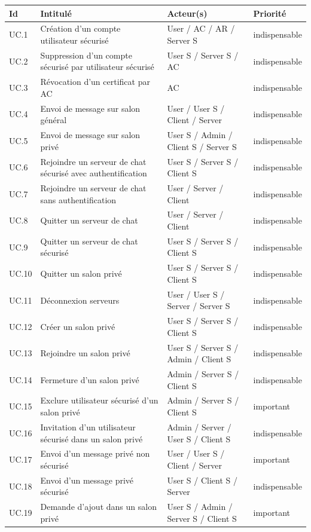 \documentclass[a4paper,11pt,french]{article}
\begin{document}
\begin{center}
\begin{tabular}{|l|p{5cm}|l|l|}
\hline
\bfseries{Id} & \bfseries{Intitulé} & \bfseries{Acteur(s)}&\bfseries{Priorité}\\
\hline
UC.1 & Création d'un compte utilisateur sécurisé & User / AC / AR / Server S&indispensable\\
\hline
UC.2 & Suppression d'un compte sécurisé par utilisateur sécurisé & User S / Server S / AC&indispensable\\
\hline
UC.3 & Révocation d'un certificat par AC & AC&indispensable\\
\hline
UC.4 & Envoi de message sur salon général & User / User S / Client / Server&indispensable\\
\hline
UC.5 & Envoi de message sur salon privé & User S / Admin / Client S / Server S&indispensable\\
\hline
UC.6 & Rejoindre un serveur de chat sécurisé avec authentification & User S / Server S / Client S&indispensable\\
\hline
UC.7 & Rejoindre un serveur de chat sans authentification & User / Server / Client&indispensable\\
\hline
UC.8 & Quitter un serveur de chat & User / Server / Client&indispensable\\
\hline
UC.9 & Quitter un serveur de chat sécurisé & User S / Server S / Client S&indispensable\\
\hline
UC.10 & Quitter un salon privé & User S / Server S / Client S&indispensable\\
\hline
UC.11 & Déconnexion serveurs & User / User S / Server / Server S&indispensable\\
\hline
UC.12 & Créer un salon privé & User S / Server S / Client S&indispensable\\
\hline
UC.13 & Rejoindre un salon privé & User S / Server S / Admin / Client S&indispensable\\
\hline
UC.14 & Fermeture d'un salon privé & Admin / Server S / Client S&indispensable\\
\hline
UC.15 & Exclure utilisateur sécurisé d'un salon privé & Admin / Server S / Client S&important\\
\hline
UC.16 & Invitation d'un utilisateur sécurisé dans un salon privé & Admin / Server / User S / Client S&indispensable\\
\hline 
UC.17 & Envoi d'un message privé non sécurisé & User / User S / Client / Server&important\\
\hline
UC.18 & Envoi d'un message privé sécurisé & User S / Client S / Server&indispensable\\
\hline
UC.19 & Demande d'ajout dans un salon privé & User S / Admin / Server S / Client S&important\\
\hline
\end{tabular}
\end{center}
\end{document}
